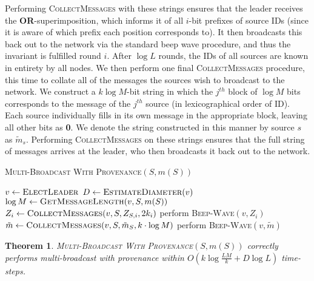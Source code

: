 \documentclass{article}
\newtheorem{theorem}{Theorem}
\begin{document}
Performing \textsc{CollectMessages} with these strings ensures that the leader receives the \textbf{OR}-superimposition, which informs it of all $i$-bit prefixes of source IDs (since it is aware of which prefix each position corresponds to). It then broadcasts this back out to the network via the standard beep wave procedure, and thus the invariant is fulfilled round $i$. After $\log L$ rounds, the IDs of all sources are known in entirety by all nodes. We then perform one final \textsc{CollectMessages} procedure, this time to collate all of the messages the sources wish to broadcast to the network. We construct a $k\log M$-bit string in which the $j^{th}$ block of $\log M$ bits corresponds to the message of the $j^{th}$ source (in lexicographical order of ID). Each source individually fills in its own message in the appropriate block, leaving all other bits as \textbf{0}. We denote the string constructed in this manner by source $s$ as $\tilde{m}_s$. Performing \textsc{CollectMessages} on these strings ensures that the full string of messages arrives at the leader, who then broadcasts it back out to the network.

\begin{algorithm}[h]
	\caption{\textsc{Multi-Broadcast With Provenance}$(S,m(S))$}
	\label{alg:MB1}
	\begin{algorithmic}
		\State $v \gets \textsc{ElectLeader}$
		\State $D \gets \textsc{EstimateDiameter}(v)$
		\State $\log M \gets \textsc{GetMessageLength}(v,S,m(S))$
		\State $Z_i \gets \textsc{CollectMessages}(v,S,Z_{S,i}, 2k_i)$
		\State perform \textsc{Beep-Wave}$(v,Z_i)$
		\EndFor
		\State $\tilde{m} \gets \textsc{CollectMessages}(v,S,\tilde{m}_{S}, k \cdot \log M)$
		\State perform \textsc{Beep-Wave}$(v,\tilde{m})$
	\end{algorithmic}
\end{algorithm}

\begin{theorem}
	\label{the:MB1}
	\textsc{Multi-Broadcast With Provenance}$(S,m(S))$ correctly performs multi-broadcast with provenance within $O(k \log \frac{LM}{k} + D \log L)$ time-steps.
\end{theorem}
\end{document}
